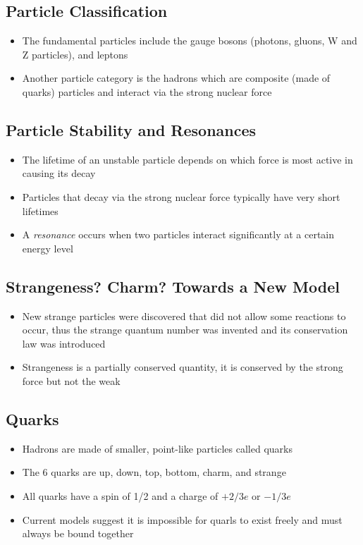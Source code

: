 \subsection{Particle Classification}
\begin{itemize}
    \item The fundamental particles include the gauge bosons (photons, gluons, W and Z particles), and leptons
    \item Another particle category is the hadrons which are composite (made of quarks) particles and interact via the strong nuclear force
\end{itemize}

\subsection{Particle Stability and Resonances}
\begin{itemize}
    \item The lifetime of an unstable particle depends on which force is most active in causing its decay
    \item Particles that decay via the strong nuclear force typically have very short lifetimes
    \item A \emph{resonance} occurs when two particles interact significantly at a certain energy level
\end{itemize}

\subsection{Strangeness? Charm? Towards a New Model}
\begin{itemize}
    \item New strange particles were discovered that did not allow some reactions to occur, thus the strange quantum number was invented and its conservation law was introduced
    \item Strangeness is a partially conserved quantity, it is conserved by the strong force but not the weak
\end{itemize}

\subsection{Quarks}
\begin{itemize}
    \item Hadrons are made of smaller, point-like particles called quarks
    \item The 6 quarks are up, down, top, bottom, charm, and strange
    \item All quarks have a spin of 1/2 and a charge of \(+2/3e\) or \(-1/3e\)
    \item Current models suggest it is impossible for quarls to exist freely and must always be bound together
\end{itemize}

